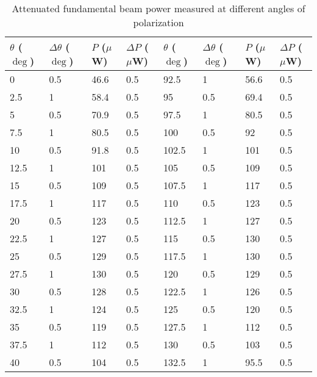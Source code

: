 \begin{table}[h!]
\centering
\caption{Attenuated fundamental beam power measured at different angles of polarization}
\label{tab:variabattcalib}
\begin{tabular}{|l|l|l|l||l|l|l|l|}
\hline
$\theta$ ($\deg$) & $\Delta \theta$ ($\deg$) & $P$ ($\mu$W) & $\Delta P$ ($\mu$W) & $\theta$ ($\deg$) & $\Delta \theta$ ($\deg$) & $P$ ($\mu$W) & $\Delta P$ ($\mu$W) \\ \hline
0     & 0.5         & 46.6    & 0.5     & 92.5  & 1           & 56.6    & 0.5     \\ \hline
2.5   & 1           & 58.4    & 0.5     & 95    & 0.5         & 69.4    & 0.5     \\ \hline
5     & 0.5         & 70.9    & 0.5     & 97.5  & 1           & 80.5    & 0.5     \\ \hline
7.5   & 1           & 80.5    & 0.5     & 100   & 0.5         & 92      & 0.5     \\ \hline
10    & 0.5         & 91.8    & 0.5     & 102.5 & 1           & 101     & 0.5     \\ \hline
12.5  & 1           & 101     & 0.5     & 105   & 0.5         & 109     & 0.5     \\ \hline
15    & 0.5         & 109     & 0.5     & 107.5 & 1           & 117     & 0.5     \\ \hline
17.5  & 1           & 117     & 0.5     & 110   & 0.5         & 123     & 0.5     \\ \hline
20    & 0.5         & 123     & 0.5     & 112.5 & 1           & 127     & 0.5     \\ \hline
22.5  & 1           & 127     & 0.5     & 115   & 0.5         & 130     & 0.5     \\ \hline
25    & 0.5         & 129     & 0.5     & 117.5 & 1           & 130     & 0.5     \\ \hline
27.5  & 1           & 130     & 0.5     & 120   & 0.5         & 129     & 0.5     \\ \hline
30    & 0.5         & 128     & 0.5     & 122.5 & 1           & 126     & 0.5     \\ \hline
32.5  & 1           & 124     & 0.5     & 125   & 0.5         & 120     & 0.5     \\ \hline
35    & 0.5         & 119     & 0.5     & 127.5 & 1           & 112     & 0.5     \\ \hline
37.5  & 1           & 112     & 0.5     & 130   & 0.5         & 103     & 0.5     \\ \hline
40    & 0.5         & 104     & 0.5     & 132.5 & 1           & 95.5    & 0.5     \\ \hline

\end{tabular}
\end{table}
